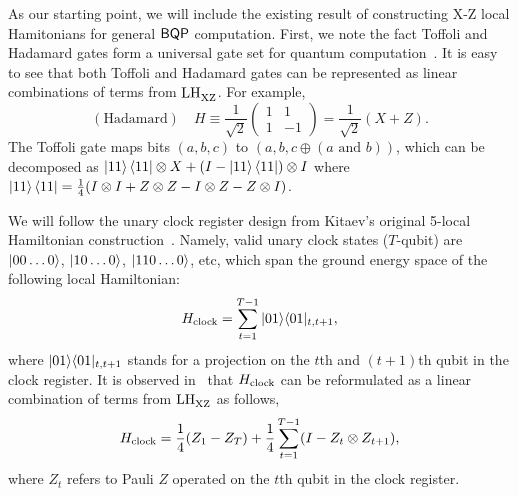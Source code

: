 As our starting point, we will include the existing result of constructing X-Z local Hamitonians for general $\operatorname{\mathsf{BQP}}$ computation.
First, we note the fact Toffoli and Hadamard gates form a universal gate set for quantum computation~\cite{Shi03, quant-ph/0301040}.
It is easy to see that both Toffoli and Hadamard gates can be represented as linear combinations of terms from $\mathrm{LH}_{\mathrm{XZ}}^{}$. For example,
 \begin{equation}
     \mathrm{(Hadamard)} \quad H \equiv \frac{1}{\sqrt{2}} \begin{pmatrix}1&1\\1&-1\end{pmatrix} = \frac{1}{\sqrt{2}}\left (X+Z\right).
 \end{equation}
 The Toffoli gate maps bits $(a,b,c)$ to $(a,b, c \oplus (a \text{ and } b))$, which can be decomposed as $\ket{11}\bra{11}\otimes X+(I-\ket{11}\bra{11})\otimes I$ where $\ket{11}\bra{11}=\frac{1}{4}(I\otimes I+Z\otimes Z-I\otimes Z-Z\otimes I)$.

We will follow the unary clock register design from Kitaev's original 5-local Hamiltonian construction~\cite{kitaev2002classical}. Namely, valid unary clock states ($T$-qubit) are $\ket{00\ldots0}$, $\ket{10\dots0}$, $\ket{110\ldots0}$, etc, which span the ground energy space of the following local Hamiltonian:
\begin{equation}
    H_{\mathrm{clock}}= \sum_{t=1}^{T-1}|01\rangle\langle 01|_{t,t+1},
\end{equation}
where $|01\rangle\langle 01|_{t,t+1}$ stands for a projection on the $t$th and $(t+1)$th qubit in the clock register.
It is observed in~\cite{PhysRevA.78.012352} that $H_{\mathrm{clock}}$ can be reformulated as a linear combination of terms from $\mathrm{LH}_{\mathrm{XZ}}^{}$ as follows,
\begin{equation} \label{eqn:Hclock}
   H_{\mathrm{clock}}= \frac{1}{4}(Z_1 - Z_T) + \frac{1}{4}\sum_{t=1}^{T-1}(I-Z_t\otimes Z_{t+1}),
\end{equation}
where $Z_t$ refers to Pauli $Z$ operated on the $t$th qubit in the clock register.

